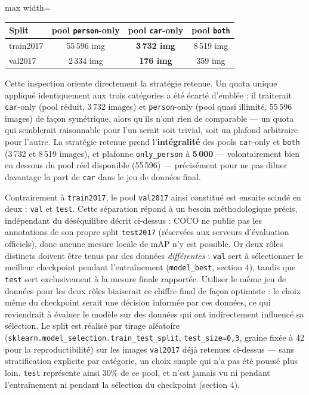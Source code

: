 \documentclass[11pt,a4paper]{article}
\begin{document}
    \begin{table}[!htbp]
    \centering
    \small
    \begin{adjustbox}{max width=\linewidth}
    \begin{tabular}{@{}lccc@{}}
    \toprule
    \textbf{Split} & \textbf{pool \texttt{person}-only} & \textbf{pool \texttt{car}-only} & \textbf{pool \texttt{both}} \\
    \midrule
    train2017 & 55\,596 img & \textbf{3\,732 img} & 8\,519 img \\
    val2017   & 2\,334 img  & \textbf{176 img}    & 359 img    \\
    \bottomrule
    \end{tabular}
    \end{adjustbox}
    \end{table}
    
    Cette inspection oriente directement la stratégie retenue. Un quota
    unique appliqué identiquement aux trois catégories a été écarté
    d'emblée : il traiterait \texttt{car}-only (pool réduit, 3\,732
    images) et \texttt{person}-only (pool quasi illimité, 55\,596 images)
    de façon symétrique, alors qu'ils n'ont rien de comparable --- un
    quota qui semblerait raisonnable pour l'un serait soit trivial, soit
    un plafond arbitraire pour l'autre. La stratégie retenue prend
    l'\textbf{intégralité} des pools \texttt{car}-only et \texttt{both}
    (3\,732 et 8\,519 images), et plafonne \texttt{only\_person} à
    \textbf{5\,000} --- volontairement bien en dessous du pool réel
    disponible (55\,596) --- précisément pour ne pas diluer davantage la
    part de \texttt{car} dans le jeu de données final.
    
    Contrairement à \texttt{train2017}, le pool \texttt{val2017} ainsi
    constitué est ensuite scindé en deux : \texttt{val} et \texttt{test}.
    Cette séparation répond à un besoin méthodologique précis, indépendant
    du déséquilibre décrit ci-dessus : COCO ne publie pas les annotations
    de son propre split \texttt{test2017} (réservées aux serveurs
    d'évaluation officiels), donc aucune mesure locale de mAP n'y est
    possible. Or deux rôles distincts doivent être tenus par des données
    \emph{différentes} : \texttt{val} sert à sélectionner le meilleur
    checkpoint pendant l'entraînement (\texttt{model\_best}, section 4),
    tandis que \texttt{test} sert exclusivement à la mesure finale
    rapportée. Utiliser le même jeu de données pour les deux rôles
    biaiserait ce chiffre final de façon optimiste : le choix même du
    checkpoint serait une décision informée par ces données, ce qui
    reviendrait à évaluer le modèle sur des données qui ont indirectement
    influencé sa sélection. Le split est réalisé par tirage aléatoire
    (\texttt{sklearn.model\_selection.train\_test\_split},
    \texttt{test\_size=0,3}, graine fixée à 42 pour la reproductibilité)
    sur les images \texttt{val2017} déjà retenues ci-dessus --- sans
    stratification explicite par catégorie, un choix simple qui n'a pas
    été poussé plus loin. \texttt{test} représente ainsi 30\% de ce pool,
    et n'est jamais vu ni pendant l'entraînement ni pendant la sélection
    du checkpoint (section 4).
    
\end{document}
